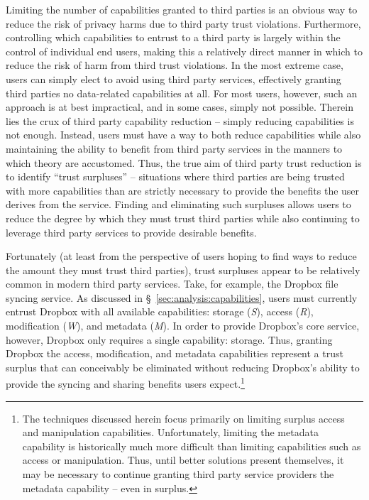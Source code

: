 Limiting the number of capabilities granted to third parties is an
obvious way to reduce the risk of privacy harms due to third party
trust violations. Furthermore, controlling which capabilities to
entrust to a third party is largely within the control of individual
end users, making this a relatively direct manner in which to reduce
the risk of harm from third trust violations. In the most extreme
case, users can simply elect to avoid using third party services,
effectively granting third parties no data-related capabilities at
all. For most users, however, such an approach is at best impractical,
and in some cases, simply not possible. Therein lies the crux of third
party capability reduction -- simply reducing capabilities is not
enough. Instead, users must have a way to both reduce capabilities
while also maintaining the ability to benefit from third party
services in the manners to which theory are accustomed. Thus, the true
aim of third party trust reduction is to identify ``trust surpluses''
-- situations where third parties are being trusted with more
capabilities than are strictly necessary to provide the benefits the
user derives from the service. Finding and eliminating such surpluses
allows users to reduce the degree by which they must trust third
parties while also continuing to leverage third party services to
provide desirable benefits.

Fortunately (at least from the perspective of users hoping to find
ways to reduce the amount they must trust third parties), trust
surpluses appear to be relatively common in modern third party
services. Take, for example, the Dropbox file syncing service. As
discussed in \S~\ref{sec:analysis:capabilities}, users must currently
entrust Dropbox with all available capabilities: storage (\emph{S}),
access (\emph{R}), modification (\emph{W}), and metadata
(\emph{M}). In order to provide Dropbox's core service, however,
Dropbox only requires a single capability: storage. Thus, granting
Dropbox the access, modification, and metadata capabilities represent
a trust surplus that can conceivably be eliminated without reducing
Dropbox's ability to provide the syncing and sharing benefits users
expect.\footnote{The techniques discussed herein focus primarily on
  limiting surplus access and manipulation
  capabilities. Unfortunately, limiting the metadata capability is
  historically much more difficult than limiting capabilities such as
  access or manipulation. Thus, until better solutions present
  themselves, it may be necessary to continue granting third party
  service providers the metadata capability -- even in surplus.}


